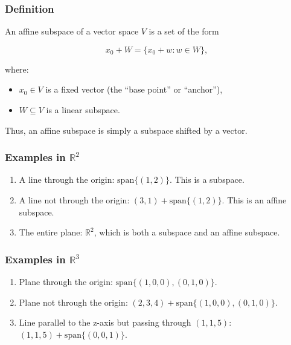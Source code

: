 \documentclass[
  letterpaper,
  DIV=11,
  numbers=noendperiod]{scrreprt}
\providecommand{\tightlist}{%
  \setlength{\itemsep}{0pt}\setlength{\parskip}{0pt}}
\begin{document}
\subsubsection{Definition}\label{definition-1}

An affine subspace of a vector space \(V\) is a set of the form

\[
x_0 + W = \{x_0 + w : w \in W\},
\]

where:

\begin{itemize}
\tightlist
\item
  \(x_0 \in V\) is a fixed vector (the ``base point'' or ``anchor''),
\item
  \(W \subseteq V\) is a linear subspace.
\end{itemize}

Thus, an affine subspace is simply a subspace shifted by a vector.

\subsubsection{\texorpdfstring{Examples in
\(\mathbb{R}^2\)}{Examples in \textbackslash mathbb\{R\}\^{}2}}\label{examples-in-mathbbr2}

\begin{enumerate}
\def\labelenumi{\arabic{enumi}.}
\tightlist
\item
  A line through the origin: \(\text{span}\{(1,2)\}\). This is a
  subspace.
\item
  A line not through the origin: \((3,1) + \text{span}\{(1,2)\}\). This
  is an affine subspace.
\item
  The entire plane: \(\mathbb{R}^2\), which is both a subspace and an
  affine subspace.
\end{enumerate}

\subsubsection{\texorpdfstring{Examples in
\(\mathbb{R}^3\)}{Examples in \textbackslash mathbb\{R\}\^{}3}}\label{examples-in-mathbbr3-1}

\begin{enumerate}
\def\labelenumi{\arabic{enumi}.}
\tightlist
\item
  Plane through the origin: \(\text{span}\{(1,0,0),(0,1,0)\}\).
\item
  Plane not through the origin:
  \((2,3,4) + \text{span}\{(1,0,0),(0,1,0)\}\).
\item
  Line parallel to the z-axis but passing through \((1,1,5)\):
  \((1,1,5) + \text{span}\{(0,0,1)\}\).
\end{enumerate}
\end{document}
